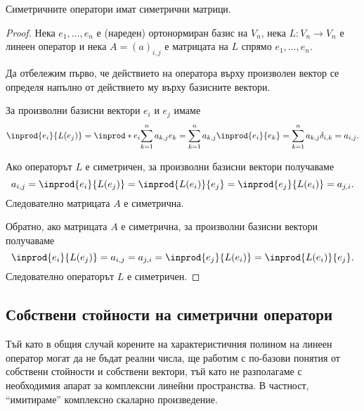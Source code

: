 \documentclass{../../common/topic}
\begin{document}
\begin{theorem}
  Симетричните оператори имат симетрични матрици.
\end{theorem}
\begin{proof}
  Нека \( e_1, \ldots, e_n \) е (нареден) ортонормиран базис на \( V_n \), нека \( L: V_n \to V_n \) е линеен оператор и нека \( A = {(a)}_{i,j} \) е матрицата на \( L \) спрямо \( e_1, \ldots, e_n \).

  Да отбележим първо, че действието на оператора върху произволен вектор се определя напълно от действието му върху базисните вектори.

  За произволни базисни вектори \( e_i \) и \( e_j \) имаме
  \begin{equation*}
    \inprod {e_i} {L(e_j)}
    =
    \inprod* {e_i} {\sum_{k=1}^n a_{k,j} e_k}
    =
    \sum_{k=1}^n a_{k,j} \inprod {e_i} {e_k}
    =
    \sum_{k=1}^n a_{k,j} \delta_{i,k}
    =
    a_{i,j}.
  \end{equation*}

  \SufficiencySubProof Ако операторът \( L \) е симетричен, за произволни базисни вектори получаваме
  \begin{equation*}
    a_{i,j}
    =
    \inprod {e_i} {L(e_j)}
    =
    \inprod {L(e_i)} {e_j}
    =
    \inprod {e_j} {L(e_i)}
    =
    a_{j,i}.
  \end{equation*}
  Следователно матрицата \( A \) е симетрична.

  \NecessitySubProof Обратно, ако матрицата \( A \) е симетрична, за произволни базисни вектори получаваме
  \begin{equation*}
    \inprod {e_i} {L(e_j)}
    =
    a_{i,j}
    =
    a_{j,i}
    =
    \inprod {e_j} {L(e_i)}
    =
    \inprod {L(e_i)} {e_j}.
  \end{equation*}
  Следователно операторът \( L \) е симетричен.
\end{proof}

\subsection{Собствени стойности на симетрични оператори}

Тъй като в общия случай корените на характеристичния полином на линеен оператор могат да не бъдат реални числа, ще работим с по-базови понятия от собствени стойности и собствени вектори, тъй като не разполагаме с необходимия апарат за комплексни линейни пространства. В частност, \enquote{имитираме} комплексно скаларно произведение.
\end{document}
